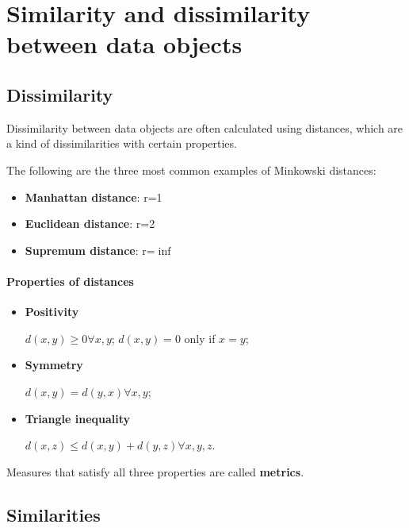 \section{Similarity and dissimilarity between data objects}

\subsection{Dissimilarity}
Dissimilarity between data objects are often calculated using distances, which are a kind of dissimilarities with certain properties.


The following are the three most common examples of Minkowski distances:

\begin{itemize}
    \item \textbf{Manhattan distance}: r=1
    \item \textbf{Euclidean distance}: r=2
    \item \textbf{Supremum distance}: r=$\inf$
\end{itemize}

\paragraph{Properties of distances}

\begin{itemize}
    \item \textbf{Positivity}
    
    $d(x,y) \geq 0 \forall x,y$; $d(x,y) = 0$ only if $x = y$;

    \item \textbf{Symmetry}

    $d(x,y) = d(y,x) \forall x,y$;

    \item \textbf{Triangle inequality}

    $d(x,z) \leq d(x,y) + d(y,z) \forall x,y,z$.
\end{itemize}
Measures that satisfy all three properties are called \textbf{metrics}.

\subsection{Similarities}

